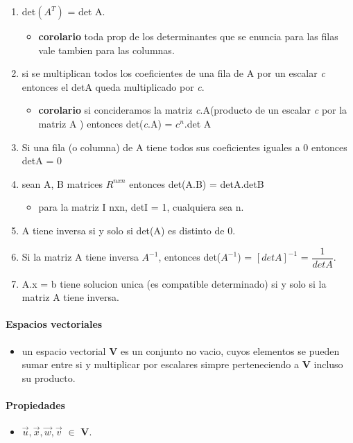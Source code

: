 \documentclass[a4paper]{article}
\begin{document}
\begin{enumerate}
	\item det$(A^T)$ = det A.
	\begin{itemize}
		\item \textbf{corolario} toda prop de los determinantes que se enuncia para las filas vale tambien para las columnas.
	\end{itemize}
	\item si se multiplican todos los coeficientes de una fila de A por un escalar \textit{c} entonces el detA queda multiplicado por \textit{c}.
	\begin{itemize}
		\item \textbf{corolario} si concideramos la matriz \textit{c}.A(producto de un escalar \textit{c} por la matriz A ) entonces det(\textit{c}.A) = $c^n$.det A
	\end{itemize}
	\item Si una fila (o columna) de A tiene todos sus coeficientes iguales a 0 entonces detA = 0
	\item sean A, B matrices $R^{nxn}$ entonces det(A.B) = detA.detB
	\begin{itemize}
		\item para la matriz I nxn, detI = 1, cualquiera sea n.
	\end{itemize}
	\item A tiene inversa si y solo si det(A) es distinto de 0.
	\item Si la matriz A tiene inversa $A^{-1}$, entonces det($A^{-1}$) = $[det A]^{-1}$ = $\dfrac{1}{det A}$.
	\item A.x = b tiene solucion unica (es compatible determinado) si y solo si la matriz A tiene inversa.
\end{enumerate}

\paragraph{Espacios vectoriales}
\begin{itemize}
	\item un espacio vectorial $\textbf{V}$ es un conjunto no vacio, cuyos elementos se pueden sumar entre si y multiplicar por escalares simpre perteneciendo a $\textbf{V}$ incluso su producto.
\end{itemize}
\paragraph{Propiedades}
\begin{itemize}
	\item $\vec{u},\vec{x},\vec{w},\vec{v}$ $\in$ $\textbf{V}$.
\end{itemize}
\end{document}
